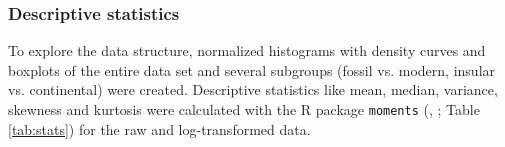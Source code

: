 



\subsubsection{Descriptive statistics}
To explore the data structure, normalized histograms with density curves and boxplots of the entire data set and several subgroups (fossil vs. modern, insular vs. continental) were created. Descriptive statistics like mean, median, variance, skewness and kurtosis were calculated with the R package \texttt{moments} (\citeauthor{Komsta2015}, \citeyear{Komsta2015}; Table \ref{tab:stats}) for the raw and log-transformed data.%

